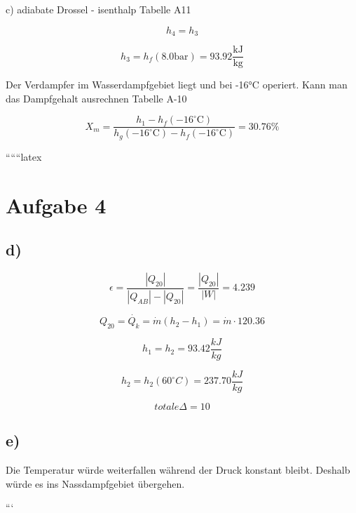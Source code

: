 c) adiabate Drossel - isenthalp Tabelle A11

\[
h_4 = h_3
\]

\[
h_3 = h_f (8.0 \text{bar}) = 93.92 \frac{\text{kJ}}{\text{kg}}
\]

Der Verdampfer im Wasserdampfgebiet liegt und bei -16°C operiert. Kann man das Dampfgehalt ausrechnen Tabelle A-10

\[
X_m = \frac{h_1 - h_f (-16^\circ \text{C})}{h_g (-16^\circ \text{C}) - h_f (-16^\circ \text{C})} = 30.76\%
\]

``````latex


\section*{Aufgabe 4}

\subsection*{d)}

\begin{equation*}
    \epsilon = \frac{|Q_{20}|}{|Q_{AB}| - |Q_{20}|} = \frac{|Q_{20}|}{|W|} = 4.239
\end{equation*}

\begin{equation*}
    Q_{20} = \dot{Q_k} = \dot{m}(h_2 - h_1) = \dot{m} \cdot 120.36
\end{equation*}

\begin{equation*}
    h_1 = h_2 = 93.42 \frac{kJ}{kg}
\end{equation*}

\begin{equation*}
    h_2 = h_2(60^\circ C) = 237.70 \frac{kJ}{kg}
\end{equation*}

\begin{equation*}
    totale \Delta = 10
\end{equation*}

\subsection*{e)}

Die Temperatur würde weiterfallen während der Druck konstant bleibt. Deshalb würde es ins Nassdampfgebiet übergehen.

```